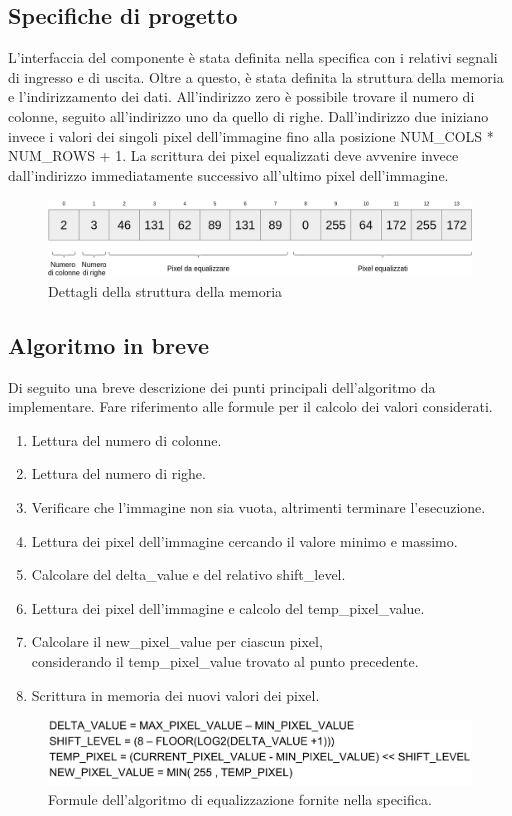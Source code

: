\documentclass{article}
\begin{document}
\subsection{Specifiche di progetto}
L'interfaccia del componente è stata definita nella specifica con i relativi segnali di ingresso e di uscita. Oltre a questo, è stata definita la struttura della memoria e l'indirizzamento dei dati. All'indirizzo zero è possibile trovare il numero di colonne, seguito all'indirizzo uno da quello di righe. Dall'indirizzo due iniziano invece i valori dei singoli pixel dell'immagine fino alla posizione NUM\_COLS * NUM\_ROWS + 1. La scrittura dei pixel equalizzati deve avvenire invece dall'indirizzo immediatamente successivo all'ultimo pixel dell'immagine.
\begin{figure}[h]
    \includegraphics[width=\textwidth]{memory.png}
    \centering
    \caption{Dettagli della struttura della memoria}
\end{figure}

\pagebreak

\subsection{Algoritmo in breve}
Di seguito una breve descrizione dei punti principali dell'algoritmo da implementare. Fare riferimento alle formule per il calcolo dei valori considerati.
\begin{enumerate}
    \item Lettura del numero di colonne.
    \item Lettura del numero di righe.
    \item Verificare che l'immagine non sia vuota, altrimenti terminare l'esecuzione.
    \item Lettura dei pixel dell'immagine cercando il valore minimo e massimo.
    \item Calcolare del delta\_value e del relativo shift\_level.
    \item Lettura dei pixel dell'immagine e calcolo del temp\_pixel\_value.
    \item Calcolare il new\_pixel\_value per ciascun pixel,\\ considerando il temp\_pixel\_value trovato al punto precedente.
    \item Scrittura in memoria dei nuovi valori dei pixel.
\end{enumerate}
\begin{figure}[h]
    \includegraphics[width=\textwidth]{formulas.png}
    \centering
    \caption{Formule dell'algoritmo di equalizzazione fornite nella specifica.}
\end{figure}
\end{document}
